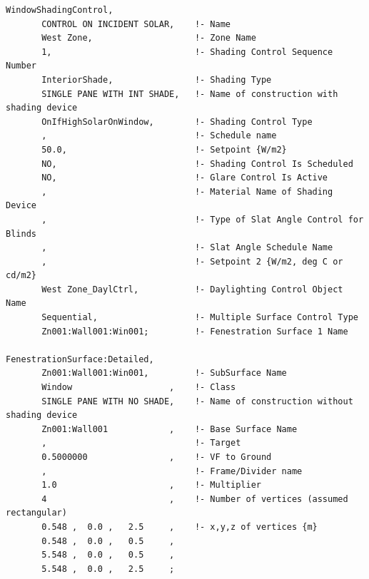 \begin{lstlisting}
WindowShadingControl,
       CONTROL ON INCIDENT SOLAR,    !- Name
       West Zone,                    !- Zone Name
       1,                            !- Shading Control Sequence Number
       InteriorShade,                !- Shading Type
       SINGLE PANE WITH INT SHADE,   !- Name of construction with shading device
       OnIfHighSolarOnWindow,        !- Shading Control Type
       ,                             !- Schedule name
       50.0,                         !- Setpoint {W/m2}
       NO,                           !- Shading Control Is Scheduled
       NO,                           !- Glare Control Is Active
       ,                             !- Material Name of Shading Device
       ,                             !- Type of Slat Angle Control for Blinds
       ,                             !- Slat Angle Schedule Name
       ,                             !- Setpoint 2 {W/m2, deg C or cd/m2}
       West Zone_DaylCtrl,           !- Daylighting Control Object Name
       Sequential,                   !- Multiple Surface Control Type
       Zn001:Wall001:Win001;         !- Fenestration Surface 1 Name

FenestrationSurface:Detailed,
       Zn001:Wall001:Win001,         !- SubSurface Name
       Window                   ,    !- Class
       SINGLE PANE WITH NO SHADE,    !- Name of construction without shading device
       Zn001:Wall001            ,    !- Base Surface Name
       ,                             !- Target
       0.5000000                ,    !- VF to Ground
       ,                             !- Frame/Divider name
       1.0                      ,    !- Multiplier
       4                        ,    !- Number of vertices (assumed rectangular)
       0.548 ,  0.0 ,   2.5     ,    !- x,y,z of vertices {m}
       0.548 ,  0.0 ,   0.5     ,
       5.548 ,  0.0 ,   0.5     ,
       5.548 ,  0.0 ,   2.5     ;
\end{lstlisting}


